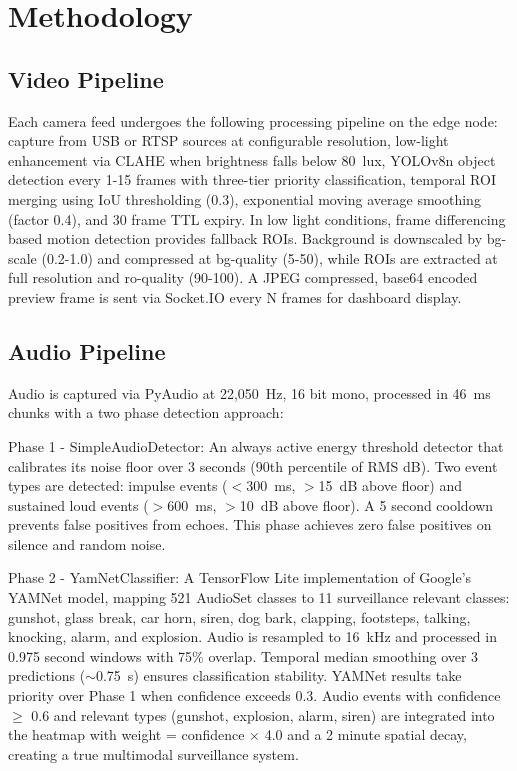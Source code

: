\documentclass[11pt,a4paper]{article}
\begin{document}
\section{Methodology}

\subsection{Video Pipeline}
Each camera feed undergoes the following processing pipeline on the edge node: capture from USB or RTSP sources at configurable resolution, low-light enhancement via CLAHE when brightness falls below 80~lux, YOLOv8n object detection every 1-15 frames with three-tier priority classification, temporal ROI merging using IoU thresholding (0.3), exponential moving average smoothing (factor 0.4), and 30 frame TTL expiry. In low light conditions, frame differencing based motion detection provides fallback ROIs. Background is downscaled by bg-scale (0.2-1.0) and compressed at bg-quality (5-50), while ROIs are extracted at full resolution and ro-quality (90-100). A JPEG compressed, base64 encoded preview frame is sent via Socket.IO every N frames for dashboard display.

\subsection{Audio Pipeline}
Audio is captured via PyAudio at 22,050~Hz, 16 bit mono, processed in 46~ms chunks with a two phase detection approach:

Phase 1 - SimpleAudioDetector: An always active energy threshold detector that calibrates its noise floor over 3 seconds (90th percentile of RMS dB). Two event types are detected: impulse events ($<$300~ms, $>$15~dB above floor) and sustained loud events ($>$600~ms, $>$10~dB above floor). A 5 second cooldown prevents false positives from echoes. This phase achieves zero false positives on silence and random noise.

Phase 2 - YamNetClassifier: A TensorFlow Lite implementation of Google's YAMNet model, mapping 521 AudioSet classes to 11 surveillance relevant classes: gunshot, glass break, car horn, siren, dog bark, clapping, footsteps, talking, knocking, alarm, and explosion. Audio is resampled to 16~kHz and processed in 0.975 second windows with 75\% overlap. Temporal median smoothing over 3 predictions ($\sim$0.75~s) ensures classification stability. YAMNet results take priority over Phase 1 when confidence exceeds 0.3. Audio events with confidence $\geq$ 0.6 and relevant types (gunshot, explosion, alarm, siren) are integrated into the heatmap with weight = confidence $\times$ 4.0 and a 2 minute spatial decay, creating a true multimodal surveillance system.
\end{document}
